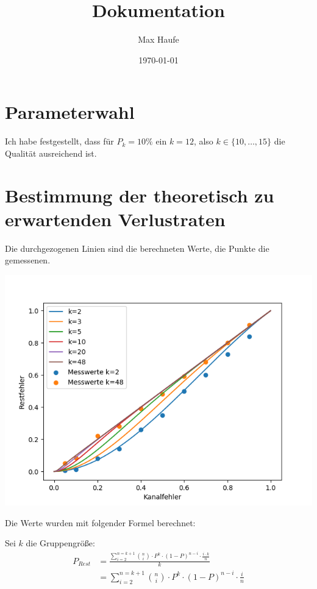 \documentclass[11pt]{article}
\title{Dokumentation}
\author{Max Haufe}
\date{\today}
\begin{document}
    \maketitle


    \section{Parameterwahl}

    Ich habe festgestellt, dass für \(P_k = 10\%\) ein \(k = 12\), also \(k \in \{10,\dots,15\}\) die Qualität ausreichend ist.


    \section{Bestimmung der theoretisch zu erwartenden Verlustraten}

    Die durchgezogenen Linien sind die berechneten Werte, die Punkte die gemessenen.
    \begin{center}
        \includegraphics[scale=0.7]{plots}
    \end{center}

    \noindent
    Die Werte wurden mit folgender Formel berechnet:

    Sei \(k\) die Gruppengröße:
    \begin{equation}
        \begin{aligned}
            P_{Rest}
            & = \frac{ \sum_{i=2}^{n =k+1} \binom{n}{i} \cdot P^k \cdot (1-P)^{n-i} \cdot \frac{i \cdot k}{n}}
            {k} \\
            & = \sum_{i=2}^{n =k+1} \binom{n}{i} \cdot P^k \cdot (1-P)^{n-i} \cdot \frac{i}{n}\\
        \end{aligned}
    \end{equation}
\end{document}
